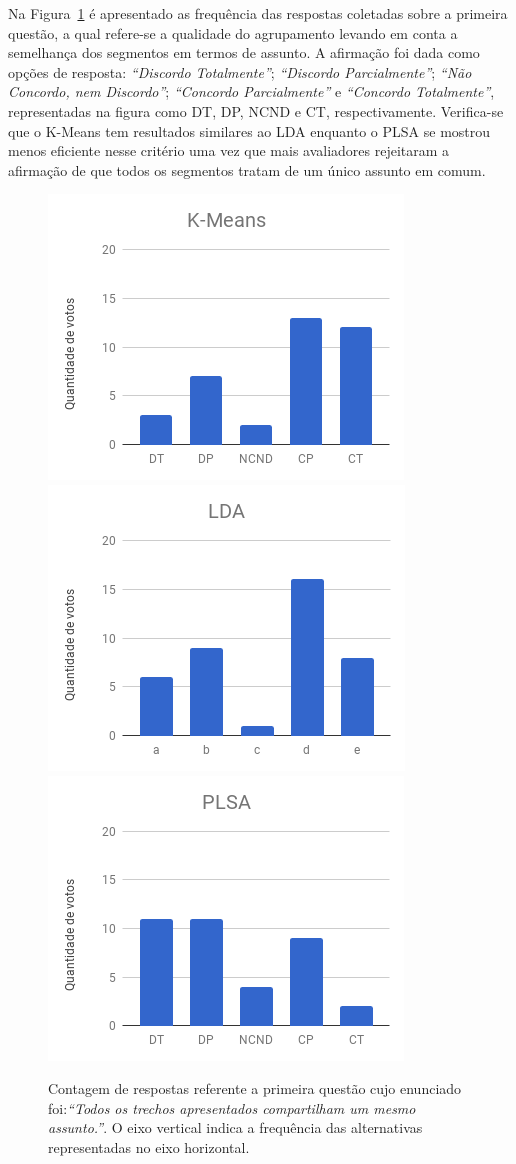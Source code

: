 Na Figura~\ref{fig:Q1} é apresentado as frequência das respostas coletadas sobre a primeira questão, 
a qual refere-se a qualidade do agrupamento levando em conta a semelhança dos segmentos em termos de assunto. A afirmação foi dada como opções de resposta: 
\textit{``Discordo Totalmente''}; 
\textit{``Discordo Parcialmente''}; 
\textit{``Não Concordo, nem Discordo''}; 
\textit{``Concordo Parcialmente''} e 
\textit{``Concordo Totalmente''}, 
representadas na figura como DT, DP, NCND e CT, respectivamente.
Verifica-se que o K-Means tem resultados similares ao LDA enquanto o PLSA se mostrou menos eficiente nesse critério uma vez que mais avaliadores rejeitaram a afirmação de que todos os segmentos tratam de um único assunto em comum. 





\begin{figure}[!h] \centering     %
		\includegraphics[width=.31\textwidth]{conteudo/capitulos/figs/figuras-experimento/Q1-KMeans.png}
		\includegraphics[width=.31\textwidth]{conteudo/capitulos/figs/figuras-experimento/Q1-LDA.png}
		\includegraphics[width=.31\textwidth]{conteudo/capitulos/figs/figuras-experimento/Q1-PLSA.png}
	\caption{Contagem de respostas referente a primeira questão cujo enunciado foi:\textit{``Todos os trechos apresentados compartilham um mesmo assunto.''}. O eixo vertical indica a frequência das alternativas representadas no eixo horizontal. }
	\label{fig:Q1}
\end{figure}







